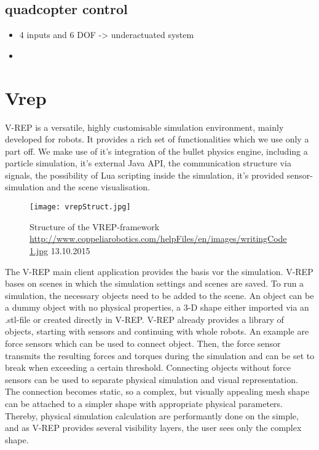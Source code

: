     \subsection{quadcopter control}
    
    
    \begin{itemize}
    \item{4 inputs and 6 DOF -> underactuated system}
    \item{}
    \end{itemize}
    
    \section{Vrep}
    \label{sec:theoryVrep}
    V-REP is a versatile, highly customisable simulation environment, mainly developed for robots. 
    It provides a rich set of functionalities which we use only a part off.  
    We make use of it's integration of the bullet physics engine, including a particle simulation, it's external Java API, the communication structure via signals, the possibility of Lua scripting inside the simulation, it's provided sensor-simulation and the scene visualisation.
    \begin{figure}[h!]
     \begin{center}
      \texttt{[image: vrepStruct.jpg]}
     \end{center}
      \caption{Structure of the VREP-framework \url{http://www.coppeliarobotics.com/helpFiles/en/images/writingCode1.jpg} 13.10.2015 \label{fig:vrepStruct}}
    \end{figure}
    
    The V-REP main client application provides the basis vor the simulation. 
    V-REP bases on scenes in which the simulation settings and scenes are saved. 
    To run a simulation, the necessary objects need to be added to the scene. 
    An object can be a dummy object with no physical properties, a 3-D shape either imported via an .stl-file or created directly in V-REP. 
    V-REP already provides a library of objects, starting with sensors and continuing with whole robots. 
    An example are force sensors which can be used to connect object. 
    Then, the force sensor transmits the resulting forces and torques during the simulation and can be set to break when exceeding a certain threshold. 
    Connecting objects without force sensors can be used to separate physical simulation and visual representation. 
    The connection becomes static, so a complex, but visually appealing mesh shape can be attached to a simpler shape with appropriate physical parameters. 
    Thereby, physical simulation calculation are performantly done on the simple, and as V-REP provides several visibility layers, the user sees only the complex shape.
    
